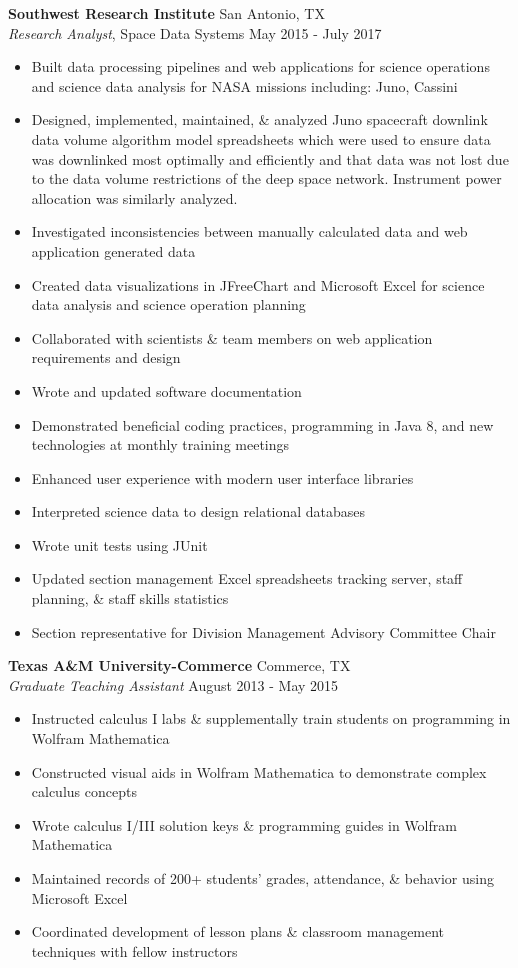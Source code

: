 \documentclass[a4paper]{article}
\begin{document}
\textbf{Southwest Research Institute} \hfill San Antonio, TX\\
\textit{Research Analyst}, Space Data Systems \hfill May 2015 - July 2017\\
\vspace{-2mm}
\begin{itemize} \itemsep .5pt
	\item Built data processing pipelines and web applications for science operations and science data analysis for NASA missions including: Juno, Cassini
	\item Designed, implemented, maintained, \& analyzed Juno spacecraft downlink data volume algorithm model spreadsheets which were used to ensure data was downlinked most optimally and efficiently and that data was not lost due to the data volume restrictions of the deep space network.  Instrument power allocation was similarly analyzed.
	\item Investigated inconsistencies between manually calculated data and web application generated data
	\item Created data visualizations in JFreeChart and Microsoft Excel for science data analysis and science operation planning
	\item Collaborated with scientists \& team members on web application requirements and design
	\item Wrote and updated software documentation
	\item Demonstrated beneficial coding practices, programming in Java 8, and new technologies at monthly training meetings
	\item Enhanced user experience with modern user interface libraries
	\item Interpreted science data to design relational databases
	\item Wrote unit tests using JUnit
	\item Updated section management Excel spreadsheets tracking server, staff planning, \& staff skills statistics
	\item Section representative for Division Management Advisory Committee Chair 
\end{itemize}
\textbf{Texas A\&M University-Commerce} \hfill Commerce, TX\\
\textit{Graduate Teaching Assistant} \hfill August 2013 - May 2015\\
\vspace{-2mm}
\begin{itemize} \itemsep .5pt
	\item Instructed calculus I labs \& supplementally train students on programming in Wolfram Mathematica
	\item Constructed visual aids in Wolfram Mathematica to demonstrate complex calculus concepts
	\item Wrote calculus I/III solution keys \& programming guides in Wolfram Mathematica
	\item Maintained records of 200+ students’ grades, attendance, \& behavior using Microsoft Excel
	\item Coordinated development of lesson plans \& classroom management techniques with fellow instructors
\end{itemize}
\end{document}
